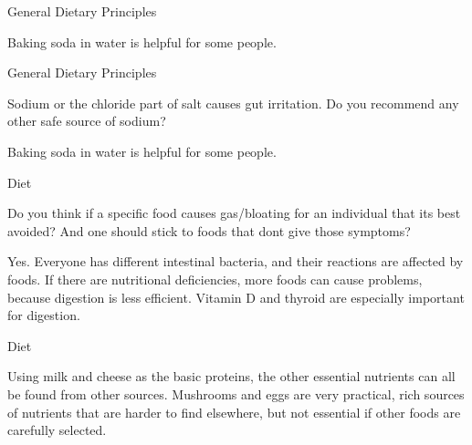 \documentclass[11pt,oneside,openany,extrafontsizes]{memoir}
\begin{document}
\begin{standalonequote}{General Dietary Principles}

    \begin{answer}
        Baking soda in water is helpful for some people.
    \end{answer}
\end{standalonequote}

\begin{qaexchange}{General Dietary Principles}

    \begin{question}
        Sodium or the chloride part of salt causes gut irritation. Do you recommend any other safe source of sodium?
    \end{question}

    \begin{answer}
        Baking soda in water is helpful for some people.
    \end{answer}
\end{qaexchange}

\begin{qaexchange}{Diet}

    \begin{question}
        Do you think if a specific food causes gas/bloating for an individual that its best avoided? And one should stick to foods that dont give those symptoms?
    \end{question}

    \begin{answer}
        Yes. Everyone has different intestinal bacteria, and their reactions are affected by foods. If there are nutritional deficiencies, more foods can cause problems, because digestion is less efficient. Vitamin D and thyroid are especially important for digestion.
    \end{answer}
\end{qaexchange}

\begin{standalonequote}{Diet}

    \begin{answer}
        Using milk and cheese as the basic proteins, the other essential nutrients can all be found from other sources. Mushrooms and eggs are very practical, rich sources of nutrients that are harder to find elsewhere, but not essential if other foods are carefully selected.
    \end{answer}
\end{standalonequote}
\end{document}
